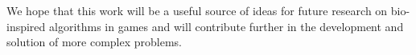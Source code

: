 \documentclass{llncs}
\begin{document}
We hope that this work will be a useful source of ideas for future research on bio-inspired algorithms in games and will contribute further in the development and solution of more complex problems.

%
%





\end{document}
